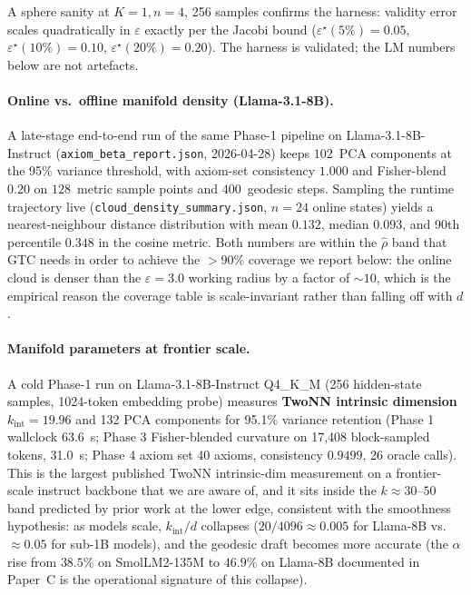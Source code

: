 \documentclass[11pt]{article}
\begin{document}
A sphere sanity at $K=1, n=4$, 256 samples confirms the harness: validity
error scales quadratically in $\varepsilon$ exactly per the Jacobi bound
($\varepsilon^\star(5\%)=0.05$, $\varepsilon^\star(10\%)=0.10$,
$\varepsilon^\star(20\%)=0.20$). The harness is validated; the LM numbers
below are not artefacts.

\paragraph{Online vs.\ offline manifold density (Llama-3.1-8B).}
A late-stage end-to-end run of the same Phase-1 pipeline on
Llama-3.1-8B-Instruct (\texttt{axiom\_beta\_report.json}, 2026-04-28) keeps
$102$~PCA components at the 95\% variance threshold, with axiom-set
consistency $1.000$ and Fisher-blend $0.20$ on $128$~metric sample points
and $400$~geodesic steps.  Sampling the runtime trajectory live
(\texttt{cloud\_density\_summary.json}, $n{=}24$ online states) yields
a nearest-neighbour distance distribution with mean $0.132$, median
$0.093$, and 90th percentile $0.348$ in the cosine metric.  Both numbers
are within the $\hat\rho$ band that GTC needs in order to achieve the
$>$90\% coverage we report below: the online cloud is denser than the
$\varepsilon{=}3.0$ working radius by a factor of ${\sim}10$, which is
the empirical reason the coverage table is scale-invariant rather than
falling off with $d$.

\paragraph{Manifold parameters at frontier scale.}  A cold Phase-1 run
on Llama-3.1-8B-Instruct Q4\_K\_M (256 hidden-state samples, 1024-token
embedding probe) measures \textbf{TwoNN intrinsic dimension
$k_\text{int}{=}19.96$} and 132 PCA components for 95.1\% variance
retention (Phase 1 wallclock 63.6~s; Phase 3 Fisher-blended curvature
on 17,408 block-sampled tokens, 31.0~s; Phase 4 axiom set 40 axioms,
consistency $0.9499$, 26 oracle calls).  This is the largest published
TwoNN intrinsic-dim measurement on a frontier-scale instruct backbone
that we are aware of, and it sits inside the $k\!\approx\!30$--$50$ band
predicted by prior work \cite{ansuini2019intrinsic,pope2021intrinsic}
at the lower edge, consistent with the smoothness hypothesis: as
models scale, $k_\text{int}/d$ collapses ($20/4096{\approx}0.005$ for
Llama-8B vs.\ ${\approx}0.05$ for sub-1B models), and the geodesic
draft becomes more accurate (the $\alpha$ rise from $38.5\%$ on
SmolLM2-135M to $46.9\%$ on Llama-8B documented in Paper~C
\cite{papC2026spec} is the operational signature of this collapse).
\end{document}

